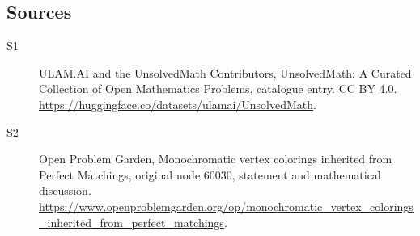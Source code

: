 \documentclass[11pt]{article}
\begin{document}
\subsection{Sources}
\begin{description}
\item[\hypertarget{source:statement:1}{S1}] ULAM.AI and the UnsolvedMath Contributors, UnsolvedMath: A Curated Collection of Open Mathematics Problems, catalogue entry. CC BY 4.0. \url{https://huggingface.co/datasets/ulamai/UnsolvedMath}.
\item[\hypertarget{source:statement:2}{S2}] Open Problem Garden, Monochromatic vertex colorings inherited from Perfect Matchings, original node 60030, statement and mathematical discussion. \url{https://www.openproblemgarden.org/op/monochromatic_vertex_colorings_inherited_from_perfect_matchings}.
\end{description}
\label{end:statement}
\end{document}
